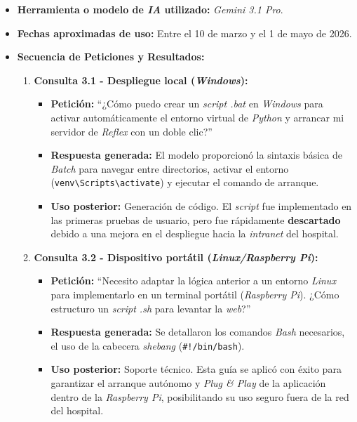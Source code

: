 \begin{itemize}
    \item \textbf{Herramienta o modelo de \textit{IA} utilizado:} \textit{Gemini 3.1 Pro}.
    \item \textbf{Fechas aproximadas de uso:} Entre el 10 de marzo y el 1 de mayo de 2026.
    \item \textbf{Secuencia de Peticiones y Resultados:}
    
    \begin{enumerate}
        \item \textbf{Consulta 3.1 - Despliegue local (\textit{Windows}):}
        \begin{itemize}
            \item \textbf{Petición:} ``¿Cómo puedo crear un \textit{script .bat} en \textit{Windows} para activar automáticamente el entorno virtual de \textit{Python} y arrancar mi servidor de \textit{Reflex} con un doble clic?''
            \item \textbf{Respuesta generada:} El modelo proporcionó la sintaxis básica de \textit{Batch} para navegar entre directorios, activar el entorno (\texttt{venv\textbackslash{}Scripts\textbackslash{}activate}) y ejecutar el comando de arranque.
            \item \textbf{Uso posterior:} Generación de código. El \textit{script} fue implementado en las primeras pruebas de usuario, pero fue rápidamente \textbf{descartado} debido a una mejora en el despliegue hacia la \textit{intranet} del hospital.
        \end{itemize}
        \vspace{0.3cm}
        
        \item \textbf{Consulta 3.2 - Dispositivo portátil (\textit{Linux/Raspberry Pi}):}
        \begin{itemize}
            \item \textbf{Petición:} ``Necesito adaptar la lógica anterior a un entorno \textit{Linux} para implementarlo en un terminal portátil (\textit{Raspberry Pi}). ¿Cómo estructuro un \textit{script .sh} para levantar la \textit{web}?''
            \item \textbf{Respuesta generada:} Se detallaron los comandos \textit{Bash} necesarios, el uso de la cabecera \textit{shebang} (\texttt{\#!/bin/bash}).
            \item \textbf{Uso posterior:} Soporte técnico. Esta guía se aplicó con éxito para garantizar el arranque autónomo y \textit{Plug \& Play} de la aplicación dentro de la \textit{Raspberry Pi}, posibilitando su uso seguro fuera de la red del hospital.
        \end{itemize}
        \vspace{0.3cm}
        

\end{enumerate}
\end{itemize}
